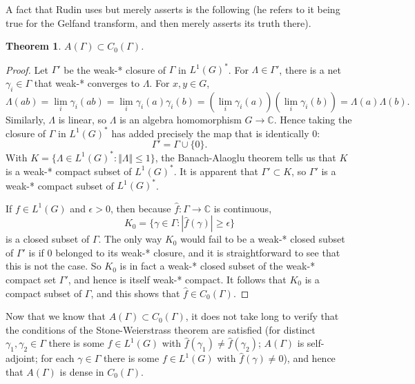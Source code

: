 \documentclass{article}
\newcommand{\norm}[1]{\Vert #1 \Vert}
\newtheorem{theorem}{Theorem}
\begin{document}
A fact that Rudin uses but merely asserts is the following (he refers to it being true for the Gelfand transform, and 
then merely asserts its truth there).

\begin{theorem}
$A(\Gamma) \subset C_0(\Gamma)$.
\end{theorem}
\begin{proof}
Let $\Gamma'$ be the weak-* closure of $\Gamma$ in $L^1(G)^*$. For $\Lambda \in \Gamma'$, there is a net
$\gamma_i \in \Gamma$ that weak-* converges to $\Lambda$. For $x,y \in G$,
\[
\Lambda(ab)=\lim_i \gamma_i(ab) = \lim_i \gamma_i(a)\gamma_i(b) = \left( \lim_i \gamma_i(a) \right) \left( \lim_i \gamma_i(b) \right)=
\Lambda(a)\Lambda(b).
\]
Similarly, $\Lambda$ is linear, so $\Lambda$ is an algebra homomorphism $G \to \mathbb{C}$. Hence
taking the closure of $\Gamma$ in $L^1(G)^*$ has added precisely the map that is identically $0$:
\[
\Gamma' = \Gamma \cup \{0\}.
\]
With $K = \{\Lambda \in L^1(G)^*: \norm{\Lambda} \leq 1\}$,  the Banach-Alaoglu theorem tells us that
$K$ is a weak-* compact subset of $L^1(G)^*$. 
It is apparent that $\Gamma' \subset K$, so $\Gamma'$ is a weak-* compact subset of $L^1(G)^*$. 


If $f \in L^1(G)$ and $\epsilon>0$, then because $\hat{f}:\Gamma \to \mathbb{C}$ is continuous,
\[
K_0=\{\gamma \in \Gamma: |\hat{f}(\gamma)| \geq \epsilon\}
\]
is a closed subset of $\Gamma$. The only way $K_0$ would fail to be a weak-* closed subset of $\Gamma'$
is if $0$ belonged to its weak-* closure, and it is straightforward to see that this is not the case. So $K_0$ is in fact
a weak-* closed subset of the weak-* compact set $\Gamma'$, and hence is itself weak-* compact. It follows that $K_0$
is a compact subset of $\Gamma$, and this shows that $\hat{f} \in C_0(\Gamma)$.
\end{proof}

Now that we know that $A(\Gamma) \subset C_0(\Gamma)$, it does not take long to verify
that the conditions of the Stone-Weierstrass theorem are satisfied (for distinct $\gamma_1,\gamma_2 \in \Gamma$
there is some $f \in L^1(G)$ with $\hat{f}(\gamma_1) \neq \hat{f}(\gamma_2)$; $A(\Gamma)$ is self-adjoint;
for each $\gamma \in \Gamma$ there is some $f \in L^1(G)$ with $\hat{f}(\gamma) \neq 0$), and hence
that $A(\Gamma)$ is dense in $C_0(\Gamma)$. 
\end{document}
